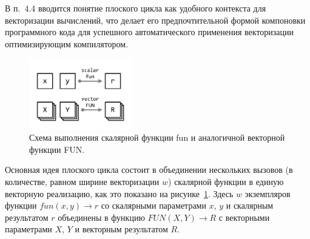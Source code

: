 \documentclass[a4paper,14pt]{extarticle}                     %
\theoremstyle{plain}                                         %
\begin{document}

В п.~4.4 вводится понятие плоского цикла как удобного контекста для векторизации вычислений, что делает его предпочтительной формой компоновки программного кода для успешного автоматического применения векторизации оптимизирующим компилятором.

\begin{figure}[ht]
\centering
\includegraphics[width=0.4\textwidth]{./pics/text_4_flat/fun.pdf}
\singlespacing
{}\caption{Схема выполнения скалярной функции fun и аналогичной векторной функции FUN.}
\label{fig:text_4_vec_flat_fun_FUN}
\end{figure}

Основная идея плоского цикла состоит в объединении нескольких вызовов (в количестве, равном ширине векторизации $w$) скалярной функции в единую векторную реализацию, как это показано на рисунке~\ref{fig:text_4_vec_flat_fun_FUN}.
Здесь $w$ экземпляров функции $fun(x, y) \rightarrow r$ со скалярными параметрами $x$, $y$ и скалярным результатом $r$ объединены в функцию $FUN(X, Y) \rightarrow R$ с векторными параметрами $X$, $Y$ и векторным результатом $R$.
\end{document}
